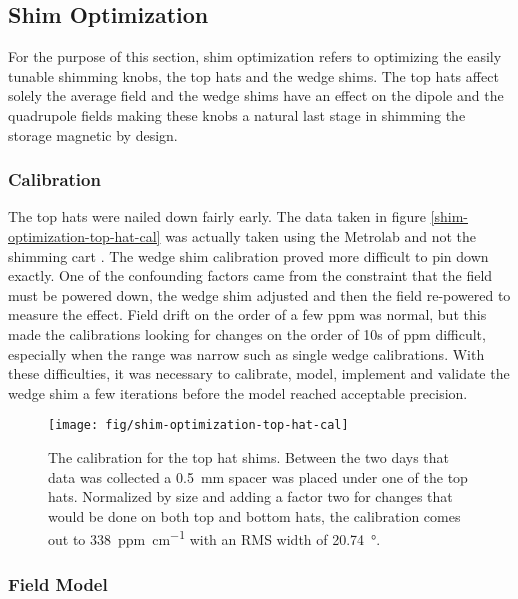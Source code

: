 \subsection{Shim Optimization}

For the purpose of this section, shim optimization refers to optimizing the easily tunable shimming knobs, the top hats and the wedge shims. The top hats affect solely the average field and the wedge shims have an effect on the dipole and the quadrupole fields making these knobs a natural last stage in shimming the storage magnetic by design.

\subsubsection{Calibration}

The top hats were nailed down fairly early.  The data taken in figure \ref{shim-optimization-top-hat-cal} was actually taken using the Metrolab and not the shimming cart .  The wedge shim calibration proved more difficult to pin down exactly.  One of the confounding factors came from the constraint that the field must be powered down, the wedge shim adjusted and then the field re-powered to measure the effect.  Field drift on the order of a few ppm was normal, but this made the calibrations looking for changes on the order of 10s of ppm difficult, especially when the range was narrow such as single wedge calibrations.  With these difficulties, it was necessary to calibrate, model, implement and validate the wedge shim a few iterations before the model reached acceptable precision.

\begin{figure}
\texttt{[image: fig/shim-optimization-top-hat-cal]}
\caption{The calibration for the top hat shims.  Between the two days that data was collected a \SI{0.5}{\milli\meter} spacer was placed under one of the top hats.  Normalized by size and adding a factor two for changes that would be done on both top and bottom hats, the calibration comes out to \SI{338}{ppm\per\centi\meter} with an RMS width of \SI{20.74}{\degree}.}
\label{fig:shim-optimization-top-hat-cal}
\end{figure}


\subsubsection{Field Model}

